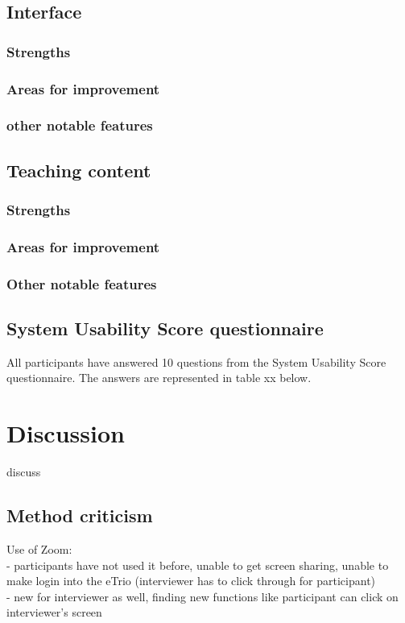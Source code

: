 \documentclass{sigchi}
\begin{document}
\subsection{Interface}
\subsubsection{Strengths}
\subsubsection{Areas for improvement}
\subsubsection{other notable features}

\subsection{Teaching content}
\subsubsection{Strengths}
\subsubsection{Areas for improvement}
\subsubsection{Other notable features}


\subsection{System Usability Score questionnaire}
All participants have answered 10 questions from the System Usability Score questionnaire. The answers are represented in table xx below. 

\section{Discussion}
discuss

\subsection{Method criticism}
Use of Zoom:\\
- participants have not used it before, unable to get screen sharing, unable to make login into the eTrio (interviewer has to click through for participant)\\
- new for interviewer as well, finding new functions like participant can click on interviewer's screen
\end{document}
